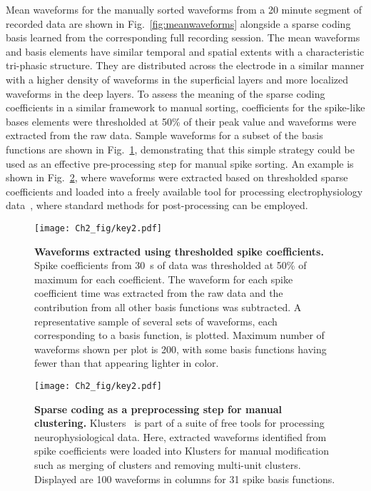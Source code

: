 Mean waveforms for the manually sorted waveforms from a 20 minute
segment of recorded data are shown in Fig.~\ref{fig:meanwaveforms}
alongside a sparse coding basis learned from the corresponding full
recording session. The mean waveforms and basis elements have similar
temporal and spatial extents with a characteristic tri-phasic
structure. They are distributed across the electrode in a similar
manner with a higher density of waveforms in the superficial layers
and more localized waveforms in the deep layers. To assess the meaning
of the sparse coding coefficients in a similar framework to manual
sorting, coefficients for the spike-like bases elements were
thresholded at 50\% of their peak value and waveforms were extracted
from the raw data. Sample waveforms for a subset of the basis
functions are shown in Fig.~\ref{fig:samplewaveforms}, demonstrating
that this simple strategy could be used as an effective pre-processing
step for manual spike sorting. An example is shown in
Fig.~\ref{fig:neuroscope}, where waveforms were extracted based on
thresholded sparse coefficients and loaded into a freely available
tool for processing electrophysiology data~\cite{Hazan:2006fk}, where
standard methods for post-processing can be employed.

\begin{figure}[htp!]
  \centering
  \texttt{[image: Ch2\_fig/key2.pdf]}
  \caption{\textbf{Waveforms extracted using thresholded spike
      coefficients.} Spike coefficients from 30~s of data was
    thresholded at 50\% of maximum for each coefficient. The waveform
    for each spike coefficient time was extracted from the raw data
    and the contribution from all other basis functions was
    subtracted. A representative sample of several sets of waveforms,
    each corresponding to a basis function, is plotted. Maximum number
    of waveforms shown per plot is 200, with some basis functions
    having fewer than that appearing lighter in color.}
  \label{fig:samplewaveforms}
\end{figure}

\begin{figure}[ht!]
  \centering
  \texttt{[image: Ch2\_fig/key2.pdf]}
  \caption{\textbf{Sparse coding as a preprocessing step for manual
      clustering.} Klusters~\cite{Hazan:2006fk} is part of a suite of
    free tools for processing neurophysiological data. Here, extracted
    waveforms identified from spike coefficients were loaded into
    Klusters for manual modification such as merging of clusters and
    removing multi-unit clusters. Displayed are 100 waveforms in
    columns for 31 spike basis functions.}
  \label{fig:neuroscope}
\end{figure}
\clearpage

